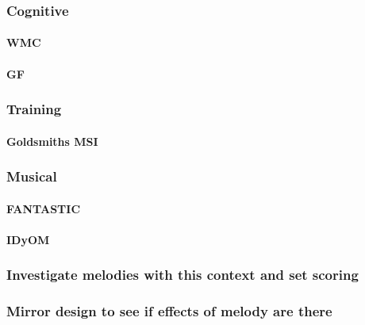 \documentclass[]{book}
\let\oldparagraph\paragraph
\renewcommand{\paragraph}[1]{\oldparagraph{#1}\mbox{}}
\theoremstyle{definition}
\theoremstyle{definition}
\theoremstyle{definition}
\theoremstyle{remark}
\begin{document}
\hypertarget{cognitive-1}{%
\subsubsection{Cognitive}\label{cognitive-1}}

\hypertarget{wmc}{%
\paragraph{WMC}\label{wmc}}

\hypertarget{gf}{%
\paragraph{GF}\label{gf}}

\hypertarget{training}{%
\subsubsection{Training}\label{training}}

\hypertarget{goldsmiths-msi}{%
\paragraph{Goldsmiths MSI}\label{goldsmiths-msi}}

\hypertarget{musical}{%
\subsubsection{Musical}\label{musical}}

\hypertarget{fantastic-1}{%
\paragraph{FANTASTIC}\label{fantastic-1}}

\hypertarget{idyom}{%
\paragraph{IDyOM}\label{idyom}}

\hypertarget{investigate-melodies-with-this-context-and-set-scoring}{%
\subsubsection{Investigate melodies with this context and set
scoring}\label{investigate-melodies-with-this-context-and-set-scoring}}

\hypertarget{mirror-design-to-see-if-effects-of-melody-are-there}{%
\subsubsection{Mirror design to see if effects of melody are
there}\label{mirror-design-to-see-if-effects-of-melody-are-there}}
\end{document}
